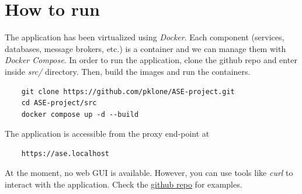 \documentclass{article}
\begin{document}
\section{How to run}
The application has been virtualized using \emph{Docker}. Each component (services, databases, message brokers, etc.) is a container and we can manage them with \emph{Docker Compose}. In order to run the application, clone the github repo and enter inside \emph{src/} directory. Then, build the images and run the containers.
\begin{verbatim}
    git clone https://github.com/pklone/ASE-project.git
    cd ASE-project/src
    docker compose up -d --build
\end{verbatim}
The application is accessible from the proxy end-point at
\begin{verbatim}
    https://ase.localhost
\end{verbatim}
At the moment, no web GUI is available. However, you can use tools like \emph{curl} to interact with the application. Check the \href{https://github.com/pklone/ASE-project/test/README.md}{github repo} for examples.
\end{document}
